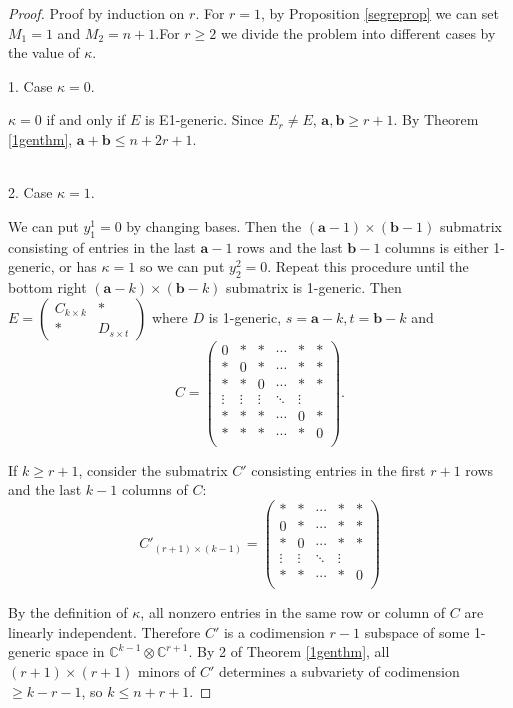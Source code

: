 \documentclass[10pt]{article} %
\newcommand{\aaa}{\mathbf{a}}
\newcommand{\bbb}{\mathbf{b}}
\newcommand{\BC}{\mathbb{C}}
\newcommand{\ot}{\otimes}
\theoremstyle{definition}
\begin{document}
\begin{proof}
Proof by induction on $r$. For $r=1$, by Proposition \ref{segreprop} we can set $M_1=1$ and $M_2=n+1$.For $r\geq 2$ we divide the problem into different cases by the value of $\kappa$.

1. Case $\kappa=0$.

$\kappa=0$ if and only if $E$ is E1-generic. Since $E_r\neq E$, $\aaa,\bbb\geq r+1$. By Theorem \ref{1genthm}, $\aaa+\bbb\leq n+2r+1$.

~\\
2. Case $\kappa=1$. 

We can put $y^1_1=0$ by changing bases. Then the $(\aaa-1)\times(\bbb-1)$ submatrix consisting of entries in the last $\aaa-1$ rows and the last $\bbb-1$ columns is either 1-generic, or has $\kappa=1$ so we can put $y^2_2=0$. Repeat this procedure until the bottom right $(\aaa-k)\times(\bbb-k)$ submatrix is 1-generic. Then $E=\begin{pmatrix}
C_{k\times k} & *\\
* & D_{s\times t}
\end{pmatrix}$
where $D$ is 1-generic, $s=\aaa-k,t=\bbb-k$ and
$$C=\begin{pmatrix}
0 & * & * & \cdots & *& *\\
* & 0 & * & \cdots & *& *\\
* & * & 0 & \cdots & *& *\\
\vdots & \vdots & \vdots & \ddots & \vdots\\
* & * & * & \cdots& 0 & *\\
* & * & * & \cdots& * & 0\\
\end{pmatrix}.$$

If $k\geq r+1$, consider the submatrix $C'$ consisting entries in the first $r+1$ rows and the last $k-1$ columns of $C$:
$$C'_{(r+1)\times(k-1)}=\begin{pmatrix}
 * & * & \cdots & *& *\\
 0 & * & \cdots & *& *\\
 * & 0 & \cdots & *& *\\
 \vdots & \vdots & \ddots & \vdots\\
 * & * & \cdots& * & 0\\
\end{pmatrix}$$

By the definition of $\kappa$, all nonzero entries in the same row or column of $C$ are linearly independent. Therefore $C'$ is a codimension $r-1$ subspace of some 1-generic space in $\BC^{k-1}\ot\BC^{r+1}$. By 2 of Theorem \ref{1genthm}, all $(r+1)\times(r+1)$ minors of $C'$ determines a subvariety of codimension $\geq k-r-1$, so $k\leq n+r+1$.


\end{proof}
\end{document}
